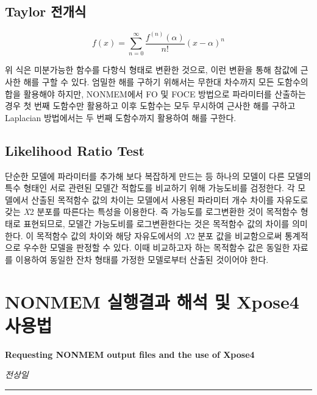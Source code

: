 \documentclass[
  10pt,
]{krantz}
\begin{document}
\hypertarget{taylor-uxc804uxac1cuxc2dd}{%
\section{Taylor 전개식}\label{taylor-uxc804uxac1cuxc2dd}}

\[f(x) = \sum_{n = 0}^{\infty}\frac{f^{\left( n \right)}\left( \alpha \right)}{n!}{(x - \alpha)}^{n}\]

위 식은 미분가능한 함수를 다항식 형태로 변환한 것으로, 이런 변환을 통해 참값에 근사한 해를 구할 수 있다. 엄밀한 해를 구하기
위해서는 무한대 차수까지 모든 도함수의 합을 활용해야 하지만, NONMEM에서 FO 및 FOCE 방법으로 파라미터를 산출하는 경우
첫 번째 도함수만 활용하고 이후 도함수는 모두 무시하여 근사한 해를 구하고 Laplacian 방법에서는 두 번째 도함수까지
활용하여 해를 구한다.

\hypertarget{likelihood-ratio-test}{%
\section{Likelihood Ratio Test}\label{likelihood-ratio-test}}

단순한 모델에 파라미터를 추가해 보다 복잡하게 만드는 등 하나의 모델이 다른 모델의 특수 형태인 서로 관련된 모델간 적합도를
비교하기 위해 가능도비를 검정한다. 각 모델에서 산출된 목적함수 값의 차이는 모델에서 사용된 파라미터 개수 차이를
자유도로 갖는 \emph{Χ}2 분포를 따른다는 특성을 이용한다. 즉 가능도를 로그변환한 것이 목적함수
형태로 표현되므로, 모델간 가능도비를 로그변환한다는 것은 목적함수 값의 차이를 의미한다. 이 목적함수 값의 차이와 해당
자유도에서의 \emph{Χ}2 분포 값을 비교함으로써 통계적으로 우수한 모델을 판정할 수 있다. 이때 비교하고자 하는
목적함수 값은 동일한 자료를 이용하여 동일한 잔차 형태를 가정한 모델로부터 산출된 것이어야 한다.

\hypertarget{nonmem-uxc2e4uxd589uxacb0uxacfc-uxd574uxc11d-uxbc0f-xpose4-uxc0acuxc6a9uxbc95}{%
\chapter{NONMEM 실행결과 해석 및 Xpose4 사용법}\label{nonmem-uxc2e4uxd589uxacb0uxacfc-uxd574uxc11d-uxbc0f-xpose4-uxc0acuxc6a9uxbc95}}

\textbf{Requesting NONMEM output files and the use of Xpose4}

\emph{전상일}

\begin{center}\rule{0.5\linewidth}{0.5pt}\end{center}
\end{document}
